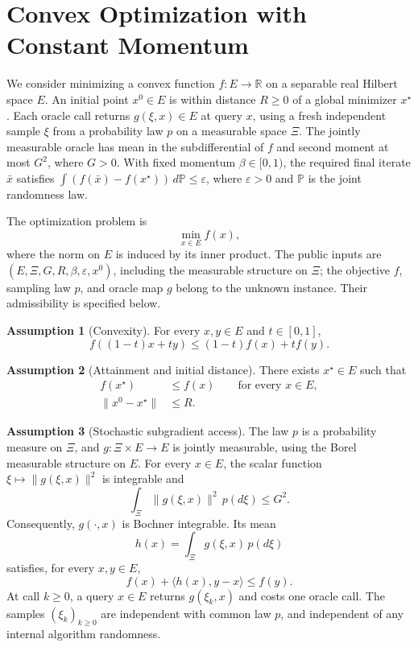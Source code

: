 \documentclass[10pt]{article}
\theoremstyle{definition}
\newtheorem{assumption}{Assumption}
\begin{document}
\section*{Convex Optimization with Constant Momentum}
We consider minimizing a convex function $f:E\to\mathbb{R}$ on a separable real Hilbert space $E$. An initial point $x^0\in E$ is within distance $R\geq0$ of a global minimizer $x^\star$. Each oracle call returns $g(\xi,x)\in E$ at query $x$, using a fresh independent sample $\xi$ from a probability law $p$ on a measurable space $\Xi$. The jointly measurable oracle has mean in the subdifferential of $f$ and second moment at most $G^2$, where $G>0$. With fixed momentum $\beta\in[0,1)$, the required final iterate $\bar{x}$ satisfies $\int(f(\bar{x})-f(x^\star))\,d\mathbb{P}\leq\varepsilon$, where $\varepsilon>0$ and $\mathbb{P}$ is the joint randomness law.

The optimization problem is
\[
\min_{x\in E} f(x),
\]
where the norm on $E$ is induced by its inner product. The public inputs are $(E,\Xi,G,R,\beta,\varepsilon,x^0)$, including the measurable structure on $\Xi$; the objective $f$, sampling law $p$, and oracle map $g$ belong to the unknown instance. Their admissibility is specified below.

\begin{assumption}[Convexity]
For every $x,y\in E$ and $t\in[0,1]$,
\[
f((1-t)x+ty)\leq(1-t)f(x)+tf(y).
\]
\end{assumption}

\begin{assumption}[Attainment and initial distance]
There exists $x^\star\in E$ such that
\begin{align*}
f(x^\star)&\leq f(x) \qquad\text{for every }x\in E,\\
\|x^0-x^\star\|&\leq R.
\end{align*}
\end{assumption}

\begin{assumption}[Stochastic subgradient access]
The law $p$ is a probability measure on $\Xi$, and $g:\Xi\times E\to E$ is jointly measurable, using the Borel measurable structure on $E$. For every $x\in E$, the scalar function $\xi\mapsto\|g(\xi,x)\|^2$ is integrable and
\[
\int_{\Xi}\|g(\xi,x)\|^2\,p(d\xi)\leq G^2.
\]
Consequently, $g(\cdot,x)$ is Bochner integrable. Its mean
\[
h(x)=\int_{\Xi}g(\xi,x)\,p(d\xi)
\]
satisfies, for every $x,y\in E$,
\[
f(x)+\langle h(x),y-x\rangle\leq f(y).
\]
At call $k\geq0$, a query $x\in E$ returns $g(\xi_k,x)$ and costs one oracle call. The samples $(\xi_k)_{k\geq0}$ are independent with common law $p$, and independent of any internal algorithm randomness.
\end{assumption}
\end{document}
